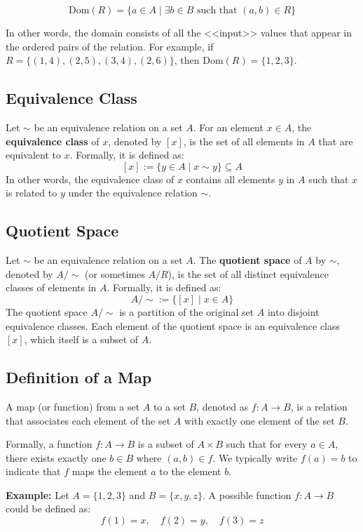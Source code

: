 \[\text{Dom}(R) = \{a \in A \mid \exists b \in B \text{ such that } (a,b) \in R\}\]

In other words, the domain consists of all the <<input>> values that appear in the ordered pairs of the relation. For example, if \(R = \{(1,4), (2,5), (3,4), (2,6)\}\), then \(\text{Dom}(R) = \{1, 2, 3\}\).

\subsection{Equivalence Class}

Let \(\sim\) be an equivalence relation on a set \(A\). For an element \(x \in A\), the \textbf{equivalence class} of \(x\), denoted by \([x]\), is the set of all elements in \(A\) that are equivalent to \(x\). Formally, it is defined as:
\[[x] := \{y \in A \mid x \sim y\} \subseteq A\]
In other words, the equivalence class of \(x\) contains all elements \(y\) in \(A\) such that \(x\) is related to \(y\) under the equivalence relation \(\sim\).

\subsection{Quotient Space}

Let \(\sim\) be an equivalence relation on a set \(A\). The \textbf{quotient space} of \(A\) by \(\sim\), denoted by \(A/\sim\) (or sometimes \(A/R\)), is the set of all distinct equivalence classes of elements in \(A\). Formally, it is defined as:
\[A/\sim := \{[x] \mid x \in A\}\]
The quotient space \(A/\sim\) is a partition of the original set \(A\) into disjoint equivalence classes. Each element of the quotient space is an equivalence class \([x]\), which itself is a subset of \(A\).

\subsection{Definition of a Map}
A map (or function) from a set \(A\) to a set \(B\), denoted as \(f: A \to B\), is a relation that associates each element of the set \(A\) with exactly one element of the set \(B\).

Formally, a function \(f: A \to B\) is a subset of \(A \times B\) such that for every \(a \in A\), there exists exactly one \(b \in B\) where \((a,b) \in f\). We typically write \(f(a) = b\) to indicate that \(f\) maps the element \(a\) to the element \(b\).

\textbf{Example:} Let \(A = \{1, 2, 3\}\) and \(B = \{x, y, z\}\). A possible function \(f: A \to B\) could be defined as:
\[
	f(1) = x, \quad f(2) = y, \quad f(3) = z
\]

